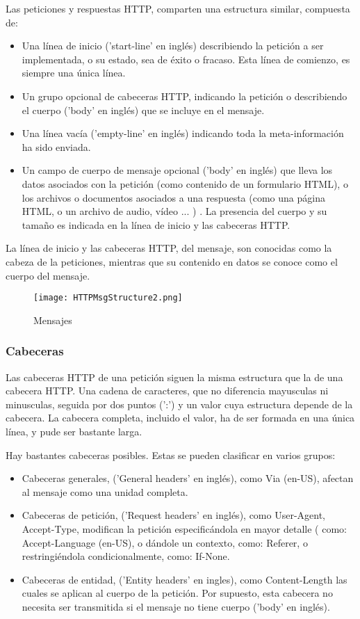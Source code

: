 Las peticiones y respuestas HTTP, comparten una estructura similar, compuesta de:

\begin{itemize}
\item Una línea de inicio ('start-line' en inglés) describiendo la petición a ser implementada, o su estado, sea de éxito o fracaso. Esta línea de comienzo, es siempre una única línea.
\item Un grupo opcional de cabeceras HTTP, indicando la petición o describiendo el cuerpo ('body' en inglés) que se incluye en el mensaje. 
\item Una línea vacía ('empty-line' en inglés) indicando toda la meta-información ha sido enviada.
\item Un campo de cuerpo de mensaje opcional ('body' en inglés) que lleva los datos asociados con la petición (como contenido de un formulario HTML), o los archivos o documentos asociados a una respuesta (como una página HTML, o un archivo de audio, vídeo ... ) . La presencia del cuerpo y su tamaño es indicada en la línea de inicio y las cabeceras HTTP.

\end{itemize}
La línea de inicio y las cabeceras HTTP, del mensaje, son conocidas como la cabeza de la peticiones, mientras que su contenido en datos se conoce como el cuerpo del mensaje.

\begin{figure}[H]
	\center
	\texttt{[image: HTTPMsgStructure2.png]}
	\caption{Mensajes}
	\label{fig:super}
\end{figure}

\subsubsection{Cabeceras}

Las cabeceras HTTP  de una petición siguen la misma estructura que la de una cabecera HTTP. Una cadena de caracteres, que no diferencia mayusculas ni minusculas, seguida por dos puntos  (':')  y un valor cuya estructura depende de la cabecera. La cabecera completa, incluido el valor, ha de ser formada en una única línea, y pude ser bastante larga. 

Hay bastantes cabeceras posibles. Estas se pueden clasificar en varios grupos: 
\begin{itemize}
	\item Cabeceras generales, ('General headers' en inglés), como Via (en-US),  afectan al mensaje como una unidad completa.
	\item Cabeceras de petición, ('Request headers' en inglés), como User-Agent, Accept-Type, modifican la petición especificándola en mayor detalle ( como: Accept-Language (en-US), o dándole un contexto, como:  Referer, o restringiéndola condicionalmente, como: If-None.
	\item Cabeceras de entidad, ('Entity headers' en ingles), como Content-Length las cuales se aplican al cuerpo de la petición. Por supuesto, esta cabecera no necesita ser transmitida si el mensaje no tiene cuerpo ('body' en inglés). 
\end{itemize}

